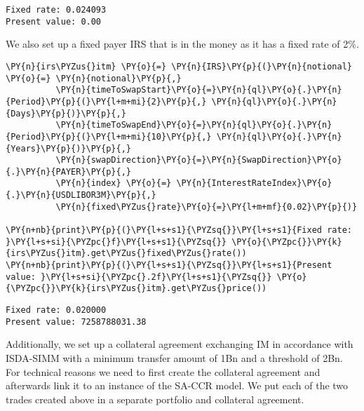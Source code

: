     \begin{Verbatim}[commandchars=\\\{\}]
Fixed rate: 0.024093
Present value: 0.00
    \end{Verbatim}

    We also set up a fixed payer IRS that is in the money as it has a fixed
rate of 2\%.

    \begin{tcolorbox}[breakable, size=fbox, boxrule=1pt, pad at break*=1mm,colback=cellbackground, colframe=cellborder]
\begin{Verbatim}[commandchars=\\\{\}]
\PY{n}{irs\PYZus{}itm} \PY{o}{=} \PY{n}{IRS}\PY{p}{(}\PY{n}{notional} \PY{o}{=} \PY{n}{notional}\PY{p}{,}
          \PY{n}{timeToSwapStart}\PY{o}{=}\PY{n}{ql}\PY{o}{.}\PY{n}{Period}\PY{p}{(}\PY{l+m+mi}{2}\PY{p}{,} \PY{n}{ql}\PY{o}{.}\PY{n}{Days}\PY{p}{)}\PY{p}{,}
          \PY{n}{timeToSwapEnd}\PY{o}{=}\PY{n}{ql}\PY{o}{.}\PY{n}{Period}\PY{p}{(}\PY{l+m+mi}{10}\PY{p}{,} \PY{n}{ql}\PY{o}{.}\PY{n}{Years}\PY{p}{)}\PY{p}{,}
          \PY{n}{swapDirection}\PY{o}{=}\PY{n}{SwapDirection}\PY{o}{.}\PY{n}{PAYER}\PY{p}{,}
          \PY{n}{index} \PY{o}{=} \PY{n}{InterestRateIndex}\PY{o}{.}\PY{n}{USDLIBOR3M}\PY{p}{,}
          \PY{n}{fixed\PYZus{}rate}\PY{o}{=}\PY{l+m+mf}{0.02}\PY{p}{)}

\PY{n+nb}{print}\PY{p}{(}\PY{l+s+s1}{\PYZsq{}}\PY{l+s+s1}{Fixed rate: }\PY{l+s+si}{\PYZpc{}f}\PY{l+s+s1}{\PYZsq{}} \PY{o}{\PYZpc{}}\PY{k}{irs\PYZus{}itm}.get\PYZus{}fixed\PYZus{}rate())
\PY{n+nb}{print}\PY{p}{(}\PY{l+s+s1}{\PYZsq{}}\PY{l+s+s1}{Present value: }\PY{l+s+si}{\PYZpc{}.2f}\PY{l+s+s1}{\PYZsq{}} \PY{o}{\PYZpc{}}\PY{k}{irs\PYZus{}itm}.get\PYZus{}price())
\end{Verbatim}
\end{tcolorbox}

    \begin{Verbatim}[commandchars=\\\{\}]
Fixed rate: 0.020000
Present value: 7258788031.38
    \end{Verbatim}

    Additionally, we set up a collateral agreement exchanging IM in
accordance with ISDA-SIMM with a minimum transfer amount of 1Bn and a
threshold of 2Bn. For technical reasons we need to first create the
collateral agreement and afterwards link it to an instance of the SA-CCR
model. We put each of the two trades created above in a separate
portfolio and collateral agreement.


